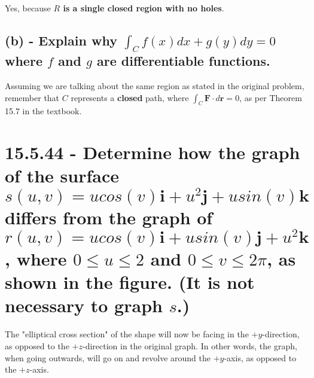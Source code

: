 \documentclass{article}
\begin{document}
\par\noindent\Large Yes, because \textbf{$R$ is a single closed region with no holes}.

\subsection{(b) - Explain why $\int_{C}f(x)dx + g(y)dy = 0$ where $f$ and $g$ are differentiable functions.}

\par\noindent\Large Assuming we are talking about the same region as stated in the original problem, remember that $C$ represents a \textbf{closed} path, where $\int_{C}\textbf{F}\cdot d\textbf{r} = 0$, as per Theorem 15.7 in the textbook.

\section{15.5.44 - Determine how the graph of the surface $s(u, v) = ucos(v)\textbf{i} + u^{2}\textbf{j} + usin(v)\textbf{k}$ differs from the graph of $r(u, v) = ucos(v)\textbf{i} + usin(v)\textbf{j} + u^{2}\textbf{k}$, where $0 \leq u \leq 2$ and $0 \leq v \leq 2\pi$, as shown in the figure.  (It is not necessary to graph $s$.)}

\par\noindent\Large The "elliptical cross section" of the shape will now be facing in the $+y$-direction, as opposed to the $+z$-direction in the original graph.  In other words, the graph, when going outwards, will go on and revolve around the $+y$-axis, as opposed to the $+z$-axis.
\end{document}
